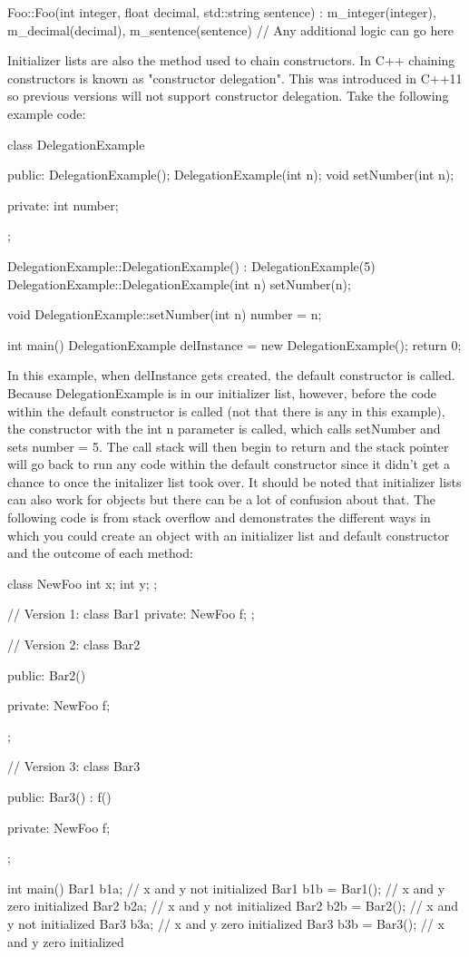 \documentclass{article}
\begin{document}
\begin{cpplst}
Foo::Foo(int integer, float decimal, std::string sentence) :
	m_integer(integer), m_decimal(decimal), m_sentence(sentence)
{
    // Any additional logic can go here
}
\end{cpplst}

Initializer lists are also the method used to chain constructors. In C++ chaining constructors is known as
"constructor delegation". This was introduced in C++11 so previous versions will not support constructor
delegation. Take the following example code:

\begin{cpplst}
class DelegationExample
{
public:
	DelegationExample();
	DelegationExample(int n);
	void setNumber(int n);

private:
	int number;
};

DelegationExample::DelegationExample() : DelegationExample(5) {}
DelegationExample::DelegationExample(int n)
{
	setNumber(n);
}

void DelegationExample::setNumber(int n)
{
    number = n;
}

int main()
{
    DelegationExample delInstance = new DelegationExample();
	return 0;
}
\end{cpplst}

In this example, when delInstance gets created, the default constructor is called. Because DelegationExample
is in our initializer list, however, before the code within the default constructor is called (not that there
is any in this example), the constructor with the int n parameter is called, which calls setNumber and sets
number = 5. The call stack will then begin to return and the stack pointer will go back to run any code within
the default constructor since it didn’t get a chance to once the initalizer list took over. It should be noted
that initializer lists can also work for objects but there can be a lot of confusion about that. The following
code is from stack overflow and demonstrates the different ways in which you could create an object with an
initializer list and default constructor and the outcome of each method:

\begin{cpplst}
class NewFoo
{
    int x;
    int y;
};

// Version 1:
class Bar1
{
private:
    NewFoo f;
};

// Version 2:
class Bar2
{
 public:
     Bar2()
     {}

private:
     NewFoo f;
};

// Version 3:
class Bar3
{
public:
    Bar3() : f()
    {}

private:
    NewFoo f;
};

int main()
{
    Bar1 b1a;           // x and y not  initialized
    Bar1 b1b = Bar1();  // x and y zero initialized
    Bar2 b2a;           // x and y not  initialized
    Bar2 b2b = Bar2();  // x and y not  initialized
    Bar3 b3a;           // x and y zero initialized
    Bar3 b3b = Bar3();  // x and y zero initialized
}
\end{cpplst}
\end{document}

